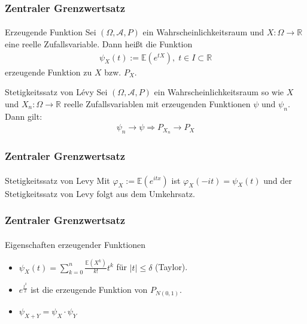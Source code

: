 \documentclass{beamer}
\begin{document}
\begin{frame}
    \frametitle{Zentraler Grenzwertsatz}
\framesubtitle{}

\begin{block}{Erzeugende Funktion}
Sei $(\Omega, \mathcal{A}, P)$ ein Wahrscheinlichkeitsraum und $X :  \Omega \to \mathbb{R}$  eine reelle Zufallsvariable. Dann heißt die Funktion 
\begin{align*}
\psi_X(t) := \mathbb{E}(e^{tX}), \; t \in I \subset \mathbb{R}
\end{align*}
erzeugende Funktion zu $X$ bzw. $P_X$.
\end{block}

\begin{block}{Stetigkeitssatz von  Lévy }
Sei $(\Omega, \mathcal{A}, P)$ ein Wahrscheinlichkeitsraum so wie  $X$ und $X_n :  \Omega \to \mathbb{R}$   reelle Zufallsvariablen mit erzeugenden Funktionen $\psi$ und $\psi_{n}$. Dann gilt:
\begin{align*}
\psi_n \to \psi \Rightarrow P_{X_n} \to P_X 
\end{align*}
\end{block}

 \end{frame}


\begin{frame}
    \frametitle{Zentraler Grenzwertsatz}
\framesubtitle{}

\begin{block}{Stetigkeitssatz von Levy}
Mit $\varphi_{X} := \mathbb{E}(e^{i tx})$  ist $\varphi _{X}(-it)=\psi_{X}(t)$ und der Stetigkeitssatz von Levy folgt aus dem Umkehrsatz.
\end{block}
 \end{frame}




\begin{frame}
    \frametitle{Zentraler Grenzwertsatz}
\framesubtitle{}
\begin{block}{Eigenschaften erzeugender Funktionen}
\begin{itemize}
\item $\psi_X(t) = \sum_{k= 0}^n \frac{\mathbb{E}(X^k)}{k!} t^k$ für $|t| \leq \delta$ (Taylor).
\item $e^{\frac{t^2}{2}}$ ist die erzeugende Funktion von $ P_{N(0,1)}$.
\item $\psi_{X +Y} = \psi_X \cdot \psi_Y$
\end{itemize}

\end{block}


 \end{frame}
\end{document}
